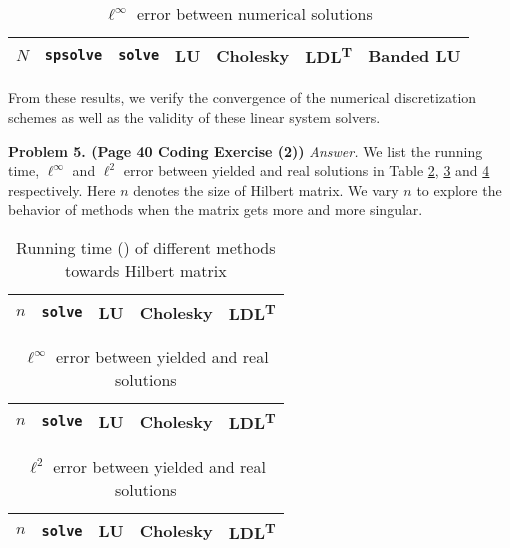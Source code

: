 \documentclass[english, nochinese]{pnote}
\begin{document}
\begin{table}[htb]
\centering
\small
\begin{tabular}{|c|c|c|c|c|c|c|}
\hline
$N$ & \verb"spsolve" & \verb"solve" & LU & Cholesky & LDL\textsuperscript{T} & Banded LU \\
\hline

\end{tabular}
\caption{$\ell^{\infty}$ error between numerical solutions}
\label{Tbl:NumNum}
\end{table}

From these results, we verify the convergence of the numerical discretization schemes as well as the validity of these linear system solvers.

\textbf{Problem 5. (Page 40 Coding Exercise (2))} \textit{Answer.} We list the running time, $\ell^{\infty}$ and $\ell^2$ error between yielded and real solutions in Table \ref{Tbl:Time}, \ref{Tbl:ErrInfty} and \ref{Tbl:Err2} respectively. Here $n$ denotes the size of Hilbert matrix. We vary $n$ to explore the behavior of methods when the matrix gets more and more singular.

\begin{table}[htb]
\centering
\begin{tabular}{|c|c|c|c|c|}
\hline
$n$ & \verb"solve" & LU & Cholesky & LDL\textsuperscript{T} \\
\hline

\end{tabular}
\caption{Running time () of different methods towards Hilbert matrix}
\label{Tbl:Time}
\end{table}

\begin{table}[htb]
\centering
\begin{tabular}{|c|c|c|c|c|}
\hline
$n$ & \verb"solve" & LU & Cholesky & LDL\textsuperscript{T} \\
\hline

\end{tabular}
\caption{$\ell^{\infty}$ error between yielded and real solutions}
\label{Tbl:ErrInfty}
\end{table}

\begin{table}[htb]
\centering
\begin{tabular}{|c|c|c|c|c|}
\hline
$n$ & \verb"solve" & LU & Cholesky & LDL\textsuperscript{T} \\
\hline

\end{tabular}
\caption{$\ell^2$ error between yielded and real solutions}
\label{Tbl:Err2}
\end{table}
\end{document}
